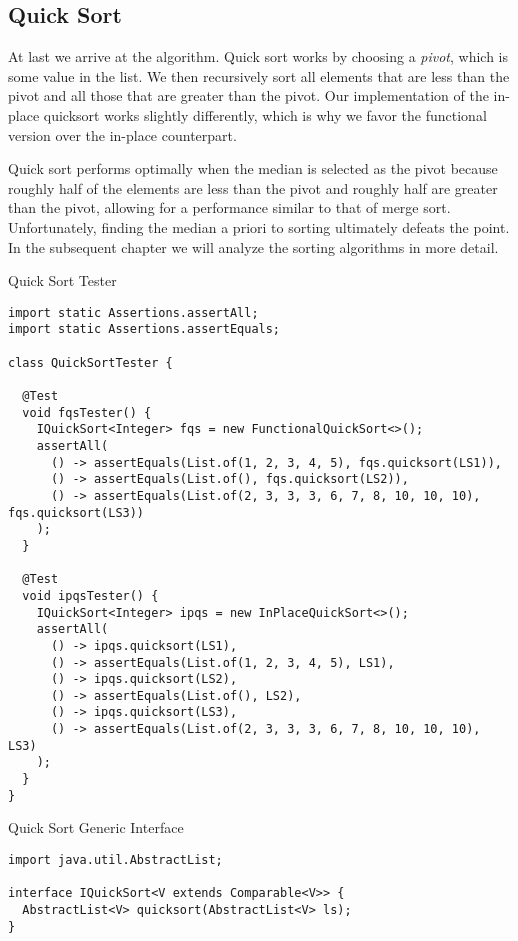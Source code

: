 \subsection*{Quick Sort}
At last we arrive at the  algorithm. Quick sort works by choosing a \textit{pivot}, which is some value in the list. We then recursively sort all elements that are less than the pivot and all those that are greater than the pivot. Our implementation of the in-place quicksort works slightly differently, which is why we favor the functional version over the in-place counterpart. 

Quick sort performs optimally when the median is selected as the pivot because roughly half of the elements are less than the pivot and roughly half are greater than the pivot, allowing for a performance similar to that of merge sort. Unfortunately, finding the median a priori to sorting ultimately defeats the point. In the subsequent chapter we will analyze the sorting algorithms in more detail.

\begin{cl}{Quick Sort Tester}
\begin{lstlisting}[language=MyJava]
import static Assertions.assertAll;
import static Assertions.assertEquals;

class QuickSortTester {

  @Test
  void fqsTester() {
    IQuickSort<Integer> fqs = new FunctionalQuickSort<>();
    assertAll(
      () -> assertEquals(List.of(1, 2, 3, 4, 5), fqs.quicksort(LS1)),
      () -> assertEquals(List.of(), fqs.quicksort(LS2)),
      () -> assertEquals(List.of(2, 3, 3, 3, 6, 7, 8, 10, 10, 10), fqs.quicksort(LS3))
    );
  }

  @Test
  void ipqsTester() {
    IQuickSort<Integer> ipqs = new InPlaceQuickSort<>();
    assertAll(
      () -> ipqs.quicksort(LS1),
      () -> assertEquals(List.of(1, 2, 3, 4, 5), LS1),
      () -> ipqs.quicksort(LS2),
      () -> assertEquals(List.of(), LS2),
      () -> ipqs.quicksort(LS3),
      () -> assertEquals(List.of(2, 3, 3, 3, 6, 7, 8, 10, 10, 10), LS3)
    );
  }
}
\end{lstlisting}
\end{cl}

\begin{cl}{Quick Sort Generic Interface}
\begin{lstlisting}[language=MyJava]
import java.util.AbstractList;

interface IQuickSort<V extends Comparable<V>> {
  AbstractList<V> quicksort(AbstractList<V> ls);
}
\end{lstlisting}
\end{cl}

